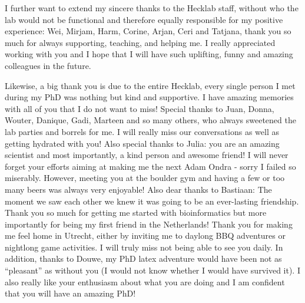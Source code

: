I further want to extend my sincere thanks to the Hecklab staff, without who the lab would not be functional and therefore equally responsible for my positive experience: Wei, Mirjam, Harm, Corine, Arjan, Ceri and Tatjana, thank you so much for always supporting, teaching, and helping me. I really appreciated working with you and I hope that I will have such uplifting, funny and amazing colleagues in the future.

Likewise, a big thank you is due to the entire Hecklab, every single person I met during my PhD was nothing but kind and supportive. I have amazing memories with all of you that I do not want to miss! Special thanks to Juan, Donna, Wouter, Danique, Gadi, Marteen and so many others, who always sweetened the lab parties and borrels for me. I will really miss our conversations as well as getting hydrated with you! Also special thanks to Julia: you are an amazing scientist and most importantly, a kind person and awesome friend! I will never forget your efforts aiming at making me the next Adam Ondra - sorry I failed so miserably. However, meeting you at the boulder gym and having a few or too many beers was always very enjoyable! Also dear thanks to Bastiaan: The moment we saw each other we knew it was going to be an ever-lasting friendship. Thank you so much for getting me started with bioinformatics but more importantly for being my first friend in the Netherlands! Thank you for making me feel home in Utrecht, either by inviting me to daylong BBQ adventures or nightlong game activities. I will truly miss not being able to see you daily. In addition, thanks to Douwe, my PhD latex adventure would have been not as “pleasant” as without you (I would not know whether I would have survived it). I also really like your enthusiasm about what you are doing and I am confident that you will have an amazing PhD!

